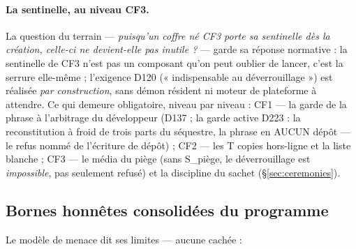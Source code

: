 \paragraph{La sentinelle, au niveau CF3.} La question du terrain — \emph{puisqu'un
coffre né CF3 porte sa sentinelle dès la création, celle-ci ne devient-elle pas
inutile ?} — garde sa réponse normative : la sentinelle de CF3 n'est pas un composant
qu'on peut oublier de lancer, c'est la serrure elle-même ; l'exigence D120
(« indispensable au déverrouillage ») est réalisée \emph{par construction}, sans
démon résident ni moteur de plateforme à attendre. Ce qui demeure obligatoire, niveau
par niveau : CF1 — la garde de la phrase à l'arbitrage du développeur (D137 ;
la garde active D223 : la reconstitution à froid de trois parts du
séquestre, la phrase en AUCUN dépôt — le refus nommé de l'écriture
de dépôt) ; CF2 — les T copies hors-ligne et
la liste blanche ; CF3 — le média du piège (sans S\_piège, le déverrouillage est
\emph{impossible}, pas seulement refusé) et la discipline du sachet
(§\ref{sec:ceremonies}).

\subsection{Bornes honnêtes consolidées du programme}\label{sec:bornes}

Le modèle de menace dit ses limites — aucune cachée :

